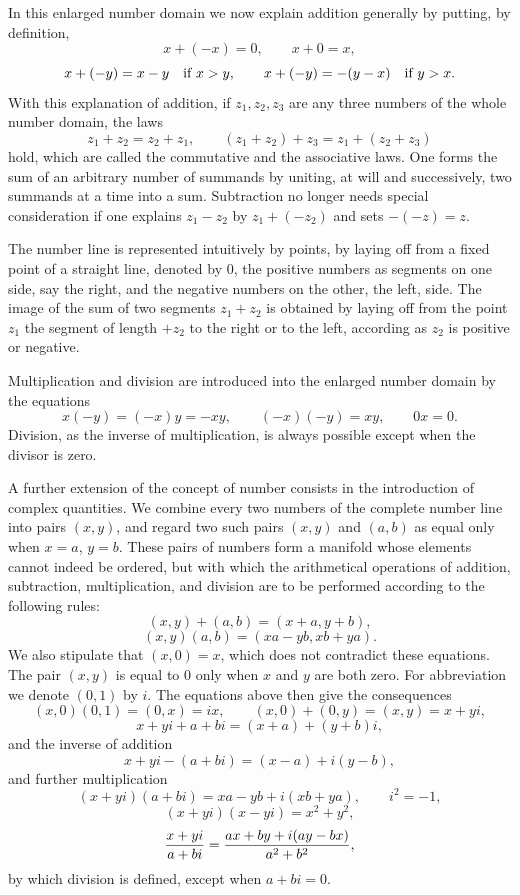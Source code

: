 \documentclass[11pt]{article}
\begin{document}
In this enlarged number domain we now explain addition generally by putting, by definition,
\[
 x+(-x)=0,
 \qquad x+0=x,
\]
\[
 x+(-y)=x-y\quad\hbox{if }x>y,
 \qquad
 x+(-y)=-(y-x)\quad\hbox{if }y>x.
\]
With this explanation of addition, if $z_1,z_2,z_3$ are any three numbers of the whole number domain, the laws
\[
 z_1+z_2=z_2+z_1,
 \qquad
 (z_1+z_2)+z_3=z_1+(z_2+z_3)
\]
hold, which are called the commutative and the associative laws. One forms the sum of an arbitrary number of summands by uniting, at will and successively, two summands at a time into a sum. Subtraction no longer needs special consideration if one explains $z_1-z_2$ by $z_1+(-z_2)$ and sets $-(-z)=z$.

The number line is represented intuitively by points, by laying off from a fixed point of a straight line, denoted by $0$, the positive numbers as segments on one side, say the right, and the negative numbers on the other, the left, side. The image of the sum of two segments $z_1+z_2$ is obtained by laying off from the point $z_1$ the segment of length $+z_2$ to the right or to the left, according as $z_2$ is positive or negative.

Multiplication and division are introduced into the enlarged number domain by the equations
\[
 x(-y)=(-x)y=-xy,
 \qquad
 (-x)(-y)=xy,
 \qquad
 0x=0.
\]
Division, as the inverse of multiplication, is always possible except when the divisor is zero.

A further extension of the concept of number consists in the introduction of complex quantities. We combine every two numbers of the complete number line into pairs $(x,y)$, and regard two such pairs $(x,y)$ and $(a,b)$ as equal only when $x=a$, $y=b$. These pairs of numbers form a manifold whose elements cannot indeed be ordered, but with which the arithmetical operations of addition, subtraction, multiplication, and division are to be performed according to the following rules:
\[
 (x,y)+(a,b)=(x+a,y+b),
\]
\[
 (x,y)(a,b)=(xa-yb,xb+ya).
\]
We also stipulate that $(x,0)=x$, which does not contradict these equations. The pair $(x,y)$ is equal to $0$ only when $x$ and $y$ are both zero. For abbreviation we denote $(0,1)$ by $i$. The equations above then give the consequences
\[
 (x,0)(0,1)=(0,x)=ix,
 \qquad
 (x,0)+(0,y)=(x,y)=x+yi,
\]
\[
 x+yi+a+bi=(x+a)+(y+b)i,
\]
and the inverse of addition
\[
 x+yi-(a+bi)=(x-a)+i(y-b),
\]
and further multiplication
\[
 (x+yi)(a+bi)=xa-yb+i(xb+ya),
 \qquad i^2=-1,
\]
\[
 (x+yi)(x-yi)=x^2+y^2,
\]
\[
 {x+yi\over a+bi}={ax+by+i(ay-bx)\over a^2+b^2},
\]
by which division is defined, except when $a+bi=0$.
\end{document}

